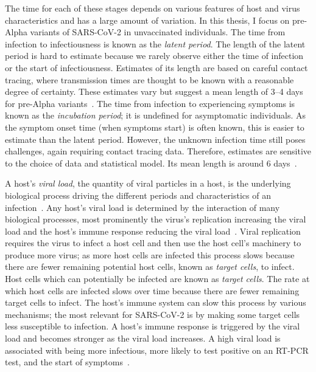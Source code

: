 \documentclass[thesis.tex]{subfiles}
\begin{document}
The time for each of these stages depends on various features of host and virus characteristics and has a large amount of variation.
In this thesis, I focus on pre-Alpha variants of SARS-CoV-2 in unvaccinated individuals.
The time from infection to infectiousness is known as the \emph{latent period}.
The length of the latent period is hard to estimate because we rarely observe either the time of infection or the start of infectiousness.
Estimates of its length are based on careful contact tracing, where transmission times are thought to be known with a reasonable degree of certainty.
These estimates vary but suggest a mean length of 3--4 days for pre-Alpha variants~\autocite[and references therein]{zhaoEstimating}.
The time from infection to experiencing symptoms is known as the \emph{incubation period}; it is undefined for asymptomatic individuals.
As the symptom onset time (when symptoms start) is often known, this is easier to estimate than the latent period.
However, the unknown infection time still poses challenges, again requiring contact tracing data.
Therefore, estimates are sensitive to the choice of data and statistical model.
Its mean length is around 6 days~\autocite{wuIncubation,quesadaIncubation,aleneSerial}.

A host's \emph{viral load}, the quantity of viral particles in a host, is the underlying biological process driving the different periods and characteristics of an infection~\autocite{puhachSARSCoV2}.
Any host's viral load is determined by the interaction of many biological processes, most prominently the virus's replication increasing the viral load and the host's immune response reducing the viral load~\autocite{keVivo}.
Viral replication requires the virus to infect a host cell and then use the host cell's machinery to produce more virus; as more host cells are infected this process slows because there are fewer remaining potential host cells, known as \emph{target cells}, to infect.
Host cells which can potentially be infected are known as \emph{target cells}.
The rate at which host cells are infected slows over time because there are fewer remaining target cells to infect.
The host's immune system can slow this process by various mechanisms; the most relevant for SARS-CoV-2 is by making some target cells less susceptible to infection.
A host's immune response is triggered by the viral load and becomes stronger as the viral load increases.
A high viral load is associated with being more infectious, more likely to test positive on an RT-PCR test, and the start of symptoms~\autocite{puhachSARSCoV2,keVivo}.
\end{document}
